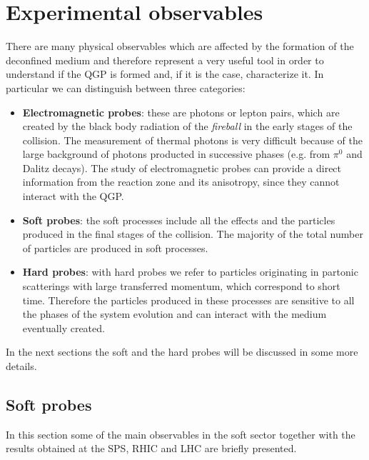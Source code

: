 \documentclass[b5paper,10pt,twoside,oldstyle,classica]{toptesi}
\begin{document}
\section{Experimental observables}
There are many physical observables which are affected by the formation of the deconfined medium and therefore represent a very useful tool in order to understand if the QGP is formed and, if it is the case, characterize it. In particular we can distinguish between three categories:
\begin{itemize}
 \item \textbf{Electromagnetic probes}: these are photons or lepton pairs, which are created by the black body radiation of the \textit{fireball} in the early stages of the collision. The measurement of thermal photons is very difficult because of the large background of photons producted in successive phases (e.g. from $\pi^0$ and Dalitz decays). The study of electromagnetic probes can provide a direct information from the reaction zone and its anisotropy, since they cannot interact with the QGP.  
 \item \textbf{Soft probes}: the soft processes include all the effects and the particles produced in the final stages of the collision.
 The majority of the total number of particles are produced in soft processes.  
 \item \textbf{Hard probes}: with hard probes we refer to particles originating in partonic scatterings with large transferred momentum, which correspond to short time. Therefore the particles produced in these processes are sensitive to all the phases of the system evolution and can interact with the medium eventually created.   
\end{itemize} 
In the next sections the soft and the hard probes will be discussed in some more details.
\subsection{Soft probes}
In this section some of the main observables in the soft sector together with the results obtained at the SPS, RHIC and LHC are briefly presented.
\end{document}
